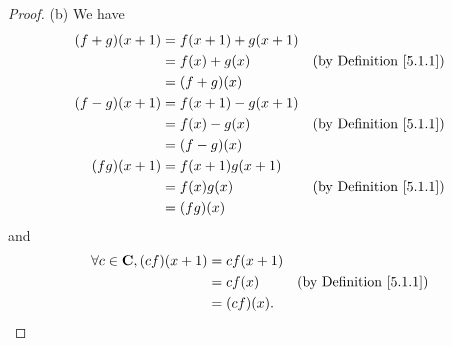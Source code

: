 \begin{proof}{(b)}
    We have
    \begin{align*}
        (f + g)(x + 1) & = f(x + 1) + g(x + 1)                                      \\
                       & = f(x) + g(x)         & \text{(by Definition \ref{5.1.1})} \\
                       & = (f + g)(x)                                               \\
        (f - g)(x + 1) & = f(x + 1) - g(x + 1)                                      \\
                       & = f(x) - g(x)         & \text{(by Definition \ref{5.1.1})} \\
                       & = (f - g)(x)                                               \\
        (f g)(x + 1)   & = f(x + 1) g(x + 1)                                        \\
                       & = f(x) g(x)           & \text{(by Definition \ref{5.1.1})} \\
                       & = (f g)(x)
    \end{align*}
    and
    \begin{align*}
        \forall c \in \mathbf{C}, (c f)(x + 1) & = c f(x + 1)                                      \\
                                               & = c f(x)     & \text{(by Definition \ref{5.1.1})} \\
                                               & = (c f)(x).
    \end{align*}
\end{proof}

